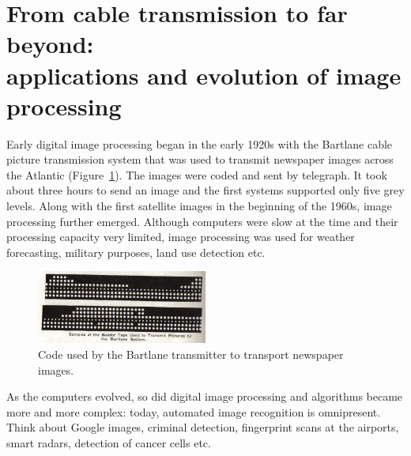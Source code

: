
\newcommand{\xvect}{\mathbf{x}} 
%
\section{From cable transmission to far beyond: \\ applications and evolution of image processing \label{sec:evolution}}
Early digital image processing began in the early 1920s with the Bartlane cable picture transmission system that was used to transmit newspaper images across the Atlantic (Figure~\ref{fig:bartlane}). The images were coded and sent by telegraph. It took about three hours to send an image and the first systems supported only five grey levels. Along with the first satellite images in the beginning of the 1960s, image processing further emerged. Although computers were slow at the time and their processing capacity very limited, image processing was used for weather forecasting, military purposes, land use detection etc. 
\begin{figure}
	\centering
	\includegraphics[width=0.5\textwidth]{../figures/Bartlane}
	\caption{Code used by the Bartlane transmitter to transport newspaper images.
		\label{fig:bartlane}}
\end{figure}

As the computers evolved, so did digital image processing and algorithms became more and more complex: today, automated image recognition is omnipresent. Think about Google images, criminal detection, fingerprint scans at the airports, smart radars, detection of cancer cells etc. 


